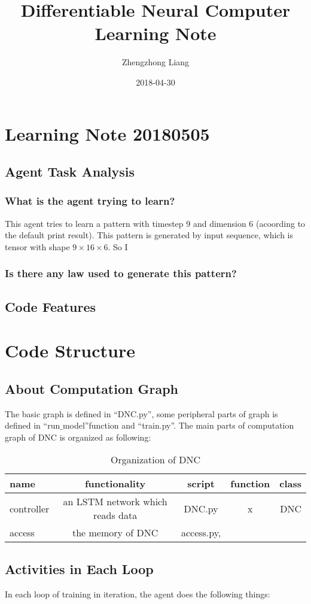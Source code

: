 \documentclass{article}
\title{Differentiable Neural Computer Learning Note}
\author{Zhengzhong Liang}
\date{2018-04-30}
\begin{document}
\maketitle
\section{Learning Note 20180505}
\subsection{Agent Task Analysis}
\subsubsection{What is the agent trying to learn?}
This agent tries to learn a pattern with timestep 9 and dimension 6 (acoording to the default print result). This pattern is generated by input sequence, which is tensor with shape $9\times16\times6$. So I
\subsubsection{Is there any law used to generate this pattern?} 
\subsection{Code Features}


\section{Code Structure}
\subsection{About Computation Graph}
The basic graph is defined in ``DNC.py'', some peripheral parts of graph is defined in ``run$\_$model''function and ``train.py''. The main parts of computation graph of DNC is organized as following:
\begin{table}
\centering
\caption{Organization of DNC}
\begin{tabular}{| l | c | c | c | r |} \hline
name & functionality & script & function & class \\ \hline
controller & an LSTM network which reads data & DNC.py & x & DNC \\ \hline
access & the memory of DNC & access.py, 
\end{tabular}
\end{table}

\subsection{Activities in Each Loop}
In each loop of training in iteration, the agent does the following things: 
\end{document}
